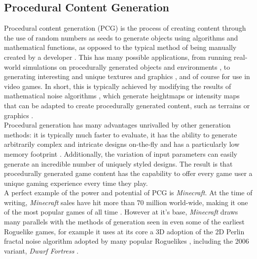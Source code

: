 \documentclass[12pt,a4paper]{article}
\begin{document}


\subsection{Procedural Content Generation}

Procedural content generation (PCG) is the process of creating content through the use of random numbers as seeds to generate objects using algorithms and mathematical functions, as opposed to the typical method of being manually created by a developer \cite{pgcbook}. This has many possible applications, from running real-world simulations on procedurally generated objects and environments \cite{VAST}, to generating interesting and unique textures and graphics \cite{imagesynth}, and of course for use in video games. In short, this is typically achieved by modifying the results of mathematical noise algorithms \cite{pgcbookch4}, which generate heightmaps or intensity maps that can be adapted to create procedurally generated content, such as terrains or graphics \cite{improvepnoise}.  \\


Procedural generation has many advantages unrivalled by other generation methods: it is typically much faster to evaluate, it has the ability to generate arbitrarily complex and intricate designs on-the-fly and has a particularly low memory footprint \cite{surveyPNF}. Additionally, the variation of input parameters can easily generate an incredible number of uniquely styled designs. The result is that procedurally generated game content has the capability to offer every game user a unique gaming experience every time they play. \\


A perfect example of the power and potential of PCG is \emph{Minecraft}. At the time of writing, \emph{Minecraft} sales have hit more than 70 million world-wide, making it one of the most popular games of all time \cite{ukie}. However at it's base, \emph{Minecraft} draws many parallels with the methods of generation seen in even some of the earliest Roguelike games, for example it uses at its core a 3D adoption of the 2D Perlin fractal noise algorithm adopted by many popular Roguelikes \cite{notch}, including the 2006 variant, \emph{Dwarf Fortress} \cite{Dunhack}. \\
\end{document}
